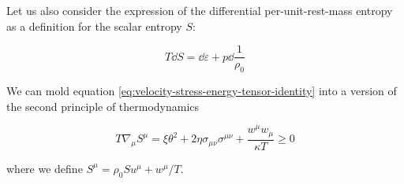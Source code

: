 \documentclass[main.tex]{subfiles}
\begin{document}
Let us also consider the expression of the differential per-unit-rest-mass entropy as a definition for the scalar entropy \(S\):

\begin{equation} \label{eq:differential-entropy}
    T\dd{S} = \dd{\varepsilon} + p \dd{\frac{1}{\rho_0}}
\end{equation}

\begin{claim}
    We can mold equation \eqref{eq:velocity-stress-energy-tensor-identity} into a version of the second principle of thermodynamics

    \begin{equation} \label{eq:second-principle-thermodynamics}
        T \nabla_\mu S^\mu = \xi \theta^2 + 2 \eta \sigma_{\mu\nu} \sigma^{\mu\nu} + \frac{w^\mu w_\mu}{\kappa T} \geq 0
    \end{equation}

    where we define \(S^\mu = \rho_0 S u^\mu + w^\mu /T\).
\end{claim}
\end{document}
